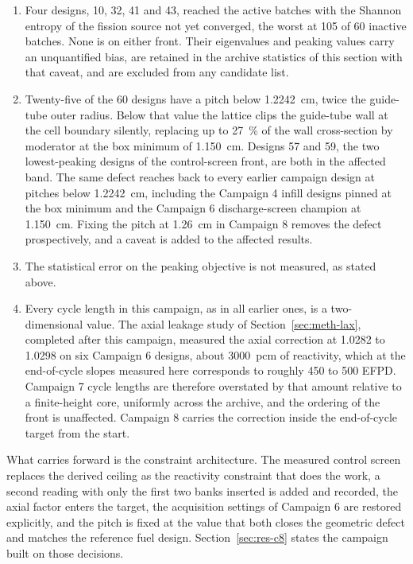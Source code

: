 \begin{enumerate}
  \item Four designs, 10, 32, 41 and 43, reached the active batches
        with the Shannon entropy of the fission source not yet
        converged, the worst at 105 of 60 inactive batches. None is on
        either front. Their eigenvalues and peaking values carry an
        unquantified bias, are retained in the archive statistics of
        this section with that caveat, and are excluded from any
        candidate list.

  \item Twenty-five of the 60 designs have a pitch below
        \SI{1.2242}{cm}, twice the guide-tube outer radius. Below that
        value the lattice clips the guide-tube wall at the cell
        boundary silently, replacing up to \SI{27}{\%} of the wall
        cross-section by moderator at the box minimum of
        \SI{1.150}{cm}. Designs 57 and 59, the two lowest-peaking
        designs of the control-screen front, are both in the affected
        band. The same defect reaches back to every earlier campaign
        design at pitches below \SI{1.2242}{cm}, including the
        Campaign 4 infill designs pinned at the box minimum and the
        Campaign 6 discharge-screen champion at \SI{1.150}{cm}. Fixing
        the pitch at \SI{1.26}{cm} in Campaign 8 removes the defect
        prospectively, and a caveat is added to the affected results.

  \item The statistical error on the peaking objective is not
        measured, as stated above.

  \item Every cycle length in this campaign, as in all earlier ones, is
        a two-dimensional value. The axial leakage study of
        Section~\ref{sec:meth-lax}, completed after this campaign,
        measured the axial correction at \num{1.0282} to \num{1.0298}
        on six Campaign 6 designs, about \SI{3000}{pcm} of reactivity,
        which at the end-of-cycle slopes measured here corresponds to
        roughly 450 to 500 EFPD. Campaign 7 cycle lengths are therefore
        overstated by that amount relative to a finite-height core,
        uniformly across the archive, and the ordering of the front is
        unaffected. Campaign 8 carries the correction inside the
        end-of-cycle target from the start.
\end{enumerate}

What carries forward is the constraint architecture. The measured
control screen replaces the derived ceiling as the reactivity
constraint that does the work, a second reading with only the first two
banks inserted is added and recorded, the axial factor enters the
target, the acquisition settings of Campaign 6 are restored explicitly,
and the pitch is fixed at the value that both closes the geometric
defect and matches the reference fuel design. Section~\ref{sec:res-c8}
states the campaign built on those decisions.
